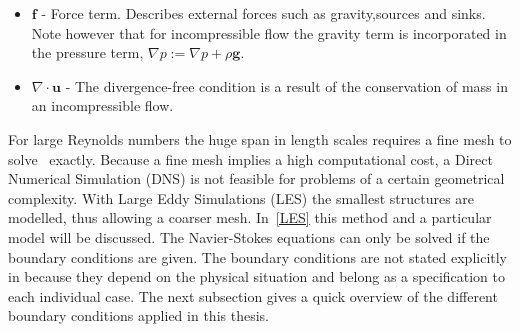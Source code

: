 \begin{itemize}
\item $\mathbf{f}$ 
    - Force term. Describes external forces such as gravity,sources and sinks. Note however that for incompressible flow the
    gravity term is incorporated in the pressure term, $\nabla p := \nabla p + \rho \mathbf{g}$. 

    \item $\nabla \cdot \mathbf{u}$ 
    - The divergence-free condition is a result of the conservation of mass in an incompressible flow.
\end{itemize}
For large Reynolds numbers the huge span in length scales requires a fine mesh 
to solve~ exactly.
Because a fine mesh implies a high computational cost, a Direct Numerical Simulation (DNS) is not feasible for 
problems of a certain geometrical complexity. 
With Large Eddy Simulations (LES) the smallest structures are modelled, thus allowing a coarser mesh. 
In~\cref{LES} this method and a particular model will be discussed. 
The Navier-Stokes equations can only be solved if the boundary conditions are given. 
The boundary conditions are not stated explicitly in  because they depend on the physical 
situation and belong as a specification to each individual case. The next subsection gives a quick overview of the different 
boundary conditions applied in this thesis.
%
